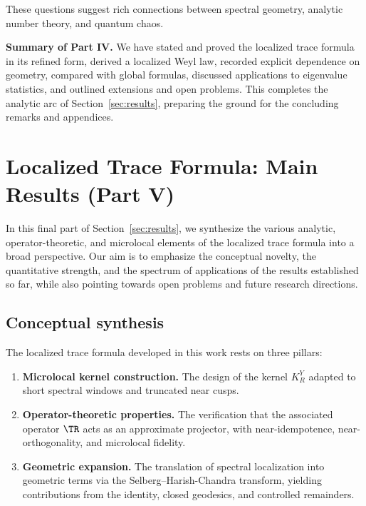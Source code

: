 These questions suggest rich connections between spectral geometry, analytic number theory, and quantum chaos.

\bigskip
\noindent\textbf{Summary of Part IV.} We have stated and proved the localized trace formula in its refined form, derived a localized Weyl law, recorded explicit dependence on geometry, compared with global formulas, discussed applications to eigenvalue statistics, and outlined extensions and open problems. This completes the analytic arc of Section~\ref{sec:results}, preparing the ground for the concluding remarks and appendices.

\section{Localized Trace Formula: Main Results (Part V)}\label{sec:results-part5}

In this final part of Section~\ref{sec:results}, we synthesize the various analytic, operator-theoretic, and microlocal elements of the localized trace formula into a broad perspective. Our aim is to emphasize the conceptual novelty, the quantitative strength, and the spectrum of applications of the results established so far, while also pointing towards open problems and future research directions.

\subsection{Conceptual synthesis}\label{subsec:synthesis}

The localized trace formula developed in this work rests on three pillars:

\begin{enumerate}
\item \textbf{Microlocal kernel construction.} The design of the kernel $K_R^Y$ adapted to short spectral windows and truncated near cusps.
\item \textbf{Operator-theoretic properties.} The verification that the associated operator $\TR$ acts as an approximate projector, with near-idempotence, near-orthogonality, and microlocal fidelity.
\item \textbf{Geometric expansion.} The translation of spectral localization into geometric terms via the Selberg--Harish-Chandra transform, yielding contributions from the identity, closed geodesics, and controlled remainders.
\end{enumerate}

